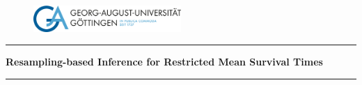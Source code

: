 
\thispagestyle{empty}

\vspace*{\fill}
\begin{center}

\begin{figure}[htbp]
  \centering
  \includegraphics[width=0.5\textwidth]{assets/uni-goe-logo.png}
\end{figure}

\rule{\linewidth}{0.5mm}

{\Large \textbf{Resampling-based Inference for Restricted Mean Survival Times}}

\rule{\linewidth}{0.5mm} \\

\end{center}

\vspace*{\fill}



\newpage
{}

{
\setcounter{tocdepth}{3}
\renewcommand{\contentsname}{Table of Contents}
\tableofcontents
}
\newpage


\listoffigures

\listoftables
